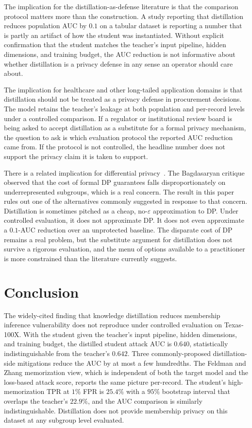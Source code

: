 \documentclass[conference]{IEEEtran}
\begin{document}
The implication for the distillation-as-defense literature is that the comparison protocol matters more than the construction. A study reporting that distillation reduces population AUC by $0.1$ on a tabular dataset is reporting a number that is partly an artifact of how the student was instantiated. Without explicit confirmation that the student matches the teacher's input pipeline, hidden dimensions, and training budget, the AUC reduction is not informative about whether distillation is a privacy defense in any sense an operator should care about.

The implication for healthcare and other long-tailed application domains is that distillation should not be treated as a privacy defense in procurement decisions. The model retains the teacher's leakage at both population and per-record levels under a controlled comparison. If a regulator or institutional review board is being asked to accept distillation as a substitute for a formal privacy mechanism, the question to ask is which evaluation protocol the reported AUC reduction came from. If the protocol is not controlled, the headline number does not support the privacy claim it is taken to support.

There is a related implication for differential privacy~\cite{bagdasaryan2019}. The Bagdasaryan critique observed that the cost of formal DP guarantees falls disproportionately on underrepresented subgroups, which is a real concern. The result in this paper rules out one of the alternatives commonly suggested in response to that concern. Distillation is sometimes pitched as a cheap, no-$\varepsilon$ approximation to DP. Under controlled evaluation, it does not approximate DP. It does not even approximate a $0.1$-AUC reduction over an unprotected baseline. The disparate cost of DP remains a real problem, but the substitute argument for distillation does not survive a rigorous evaluation, and the menu of options available to a practitioner is more constrained than the literature currently suggests.

\section*{Conclusion}

The widely-cited finding that knowledge distillation reduces membership inference vulnerability does not reproduce under controlled evaluation on Texas-100X. With the student given the teacher's input pipeline, hidden dimensions, and training budget, the distilled student attack AUC is $0.640$, statistically indistinguishable from the teacher's $0.642$. Three commonly-proposed distillation-side mitigations reduce the AUC by at most a few hundredths. The Feldman and Zhang memorization view, which is independent of both the target model and the loss-based attack score, reports the same picture per-record. The student's high-memorization TPR at $1\%$ FPR is $25.4\%$ with a $95\%$ bootstrap interval that overlaps the teacher's $22.9\%$, and the AUC comparison is similarly indistinguishable. Distillation does not provide membership privacy on this dataset at any subgroup level evaluated.
\end{document}
